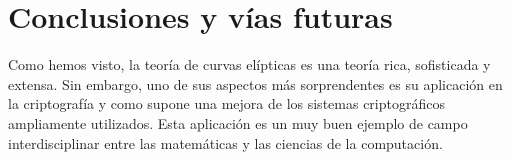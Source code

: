 \chapter{Conclusiones y vías futuras}
\label{ch:Conclusiones y vías futuras}

%
%

Como hemos visto, la teoría de curvas elípticas es una teoría rica, sofisticada y extensa. Sin embargo, uno de sus aspectos más sorprendentes es su aplicación en la criptografía y como supone una mejora de los sistemas criptográficos ampliamente utilizados. Esta aplicación es un muy buen ejemplo de campo interdisciplinar entre las matemáticas y las ciencias de la computación.

